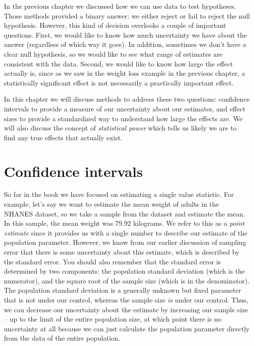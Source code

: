 \documentclass[12pt,]{book}
\theoremstyle{definition}
\theoremstyle{definition}
\theoremstyle{definition}
\theoremstyle{remark}
\begin{document}
In the previous chapter we discussed how we can use data to test hypotheses. Those methods provided a binary answer: we either reject or fail to reject the null hypothesis. However, this kind of decision overlooks a couple of important questions. First, we would like to know how much uncertainty we have about the answer (regardless of which way it goes). In addition, sometimes we don't have a clear null hypothesis, so we would like to see what range of estimates are consistent with the data. Second, we would like to know how large the effect actually is, since as we saw in the weight loss example in the previous chapter, a statistically significant effect is not necessarily a practically important effect.

In this chapter we will discuss methods to address these two questions: confidence intervals to provide a measure of our uncertainty about our estimates, and effect sizes to provide a standardized way to understand how large the effects are. We will also discuss the concept of \emph{statistical power} which tells us likely we are to find any true effects that actually exist.

\hypertarget{confidence-intervals}{%
\section{Confidence intervals}\label{confidence-intervals}}

So far in the book we have focused on estimating a single value statistic. For example, let's say we want to estimate the mean weight of adults in the NHANES dataset, so we take a sample from the dataset and estimate the mean. In this sample, the mean weight was 79.92 kilograms. We refer to this as a \emph{point estimate} since it provides us with a single number to describe our estimate of the population parameter. However, we know from our earlier discussion of sampling error that there is some uncertainty about this estimate, which is described by the standard error. You should also remember that the standard error is determined by two components: the population standard deviation (which is the numerator), and the square root of the sample size (which is in the denominator). The population standard deviation is a generally unknown but fixed parameter that is not under our control, whereas the sample size \emph{is} under our control. Thus, we can decrease our uncertainty about the estimate by increasing our sample size -- up to the limit of the entire population size, at which point there is no uncertainty at all because we can just calculate the population parameter directly from the data of the entire population.
\end{document}
